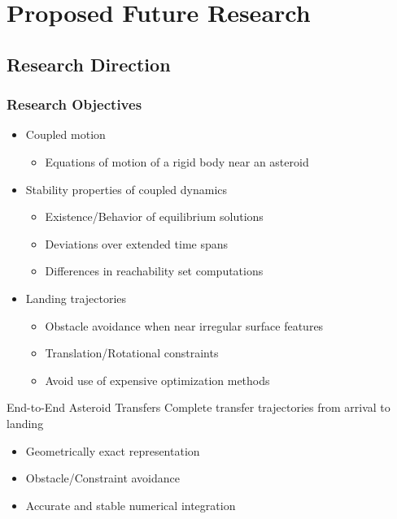 \section[Future Research]{Proposed Future Research}
\subsection[Objectives]{Research Direction}

\begin{frame}[t]\frametitle{Research Objectives}

    \begin{itemize}
        \item Coupled motion
        \begin{itemize}
            \item Equations of motion of a rigid body near an asteroid
        \end{itemize}
        \item Stability properties of coupled dynamics
        \begin{itemize}
            \item Existence/Behavior of equilibrium solutions
            \item Deviations over extended time spans
            \item Differences in reachability set computations
        \end{itemize}
        \item Landing trajectories
        \begin{itemize}
            \item Obstacle avoidance when near irregular surface features
            \item Translation/Rotational constraints
            \item Avoid use of expensive optimization methods
        \end{itemize}
    \end{itemize}
    \pause
    \begin{block}{End-to-End Asteroid Transfers}
        Complete transfer trajectories from arrival to landing
        \begin{itemize}
            \item Geometrically exact representation
            \item Obstacle/Constraint avoidance
            \item Accurate and stable numerical integration
        \end{itemize}
    \end{block}

\end{frame}